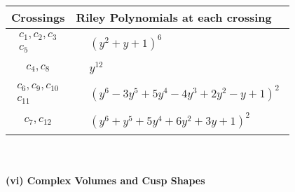 \documentclass[1p]{elsarticle_modified}
\theoremstyle{definition}
\begin{document}
\begin{tabular}{m{50pt}|m{274pt}}
Crossings & \hspace{64pt}Riley Polynomials at each crossing \\
\hline $$\begin{aligned}c_{1},c_{2},c_{3}\\c_{5}\end{aligned}$$&$\begin{aligned}
&(y^2+y+1)^6
\end{aligned}$\\
\hline $$\begin{aligned}c_{4},c_{8}\end{aligned}$$&$\begin{aligned}
&y^{12}
\end{aligned}$\\
\hline $$\begin{aligned}c_{6},c_{9},c_{10}\\c_{11}\end{aligned}$$&$\begin{aligned}
&(y^6-3 y^5+5 y^4-4 y^3+2 y^2- y+1)^2
\end{aligned}$\\
\hline $$\begin{aligned}c_{7},c_{12}\end{aligned}$$&$\begin{aligned}
&(y^6+y^5+5 y^4+6 y^2+3 y+1)^2
\end{aligned}$\\
\hline
\end{tabular}\\~\\
\newpage\flushleft \textbf{(vi) Complex Volumes and Cusp Shapes}
\end{document}
